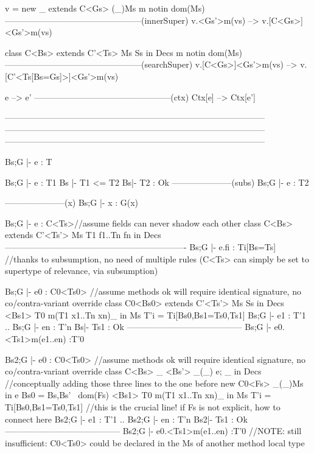    v = new _ extends C<Gs> (_){Ms}
   m notin dom(Ms)
------------------------------------------------(innerSuper)
   v.<Gs'>m(vs) --> v.[C<Gs>]<Gs'>m(vs)

   class C<Bs> extends C'<Ts>{ Ms Ss} in Decs  
   m notin dom(Ms)
------------------------------------------------(searchSuper)
   v.[C<Gs>]<Gs'>m(vs) --> v.[C'<Ts[Bs=Gs]>]<Gs'>m(vs)

         e --> e'
------------------------------------------------(ctx)
   Ctx[e] --> Ctx[e']

--------------------------------------------------------------------------------------------
--------------------------------------------------------------------------------------------
--------------------------------------------------------------------------------------------


 Bs;G |- e : T


  Bs;G |- e : T1
  Bs |- T1 <= T2
  Bs|- T2 : Ok%
---------------------(subs)
  Bs;G |- e : T2


---------------------(x)
  Bs;G |- x : G(x)

  Bs;G |- e : C<Ts>//assume fields can never shadow each other
  class C<Bs> extends C'<Ts'>{ Ms T1 f1..Tn fn} in Decs
----------------------------------------------------------------
  Bs;G |- e.fi : Ti[Bs=Ts] //thanks to subsumption, no need of multiple rules (C<Ts> can simply be set to supertype of relevance, via subsumption)

  Bs;G |- e0 : C0<Ts0>    //assume methods ok will require identical signature, no co/contra-variant override
  class C0<Bs0> extends C'<Ts'>{ Ms Ss} in Decs
  <Bs1> T0 m(T1 x1..Tn xn){_} in Ms
  T'i = Ti[Bs0,Bs1=Ts0,Ts1]
  Bs;G |- e1 : T'1 .. Bs;G |- en : T'n
  Bs|- Ts1 : Ok
-----------------------------------------
  Bs;G |- e0.<Ts1>m(e1..en) :T'0

  Bs2;G |- e0 : C0<Ts0>    //assume methods ok will require identical signature, no co/contra-variant override
  class C<Bs>{ _ <Bs'> _(_) e; _} in Decs //conceptually adding those three lines to the one before
  new C0<Fs> _(_){Ms} in e
  Bs0 = Bs,Bs' \ dom(Fs) %
  <Bs1> T0 m(T1 x1..Tn xn){_} in Ms
  T'i = Ti[Bs0,Bs1=Ts0,Ts1] //this is the crucial line! if Fs is not explicit, how to connect here
  Bs2;G |- e1 : T'1 .. Bs2;G |- en : T'n
  Bs2|- Ts1 : Ok
-----------------------------------------
  Bs2;G |- e0.<Ts1>m(e1..en) :T'0
//NOTE: still insufficient: C0<Ts0> could be declared in the Ms of another method local type

